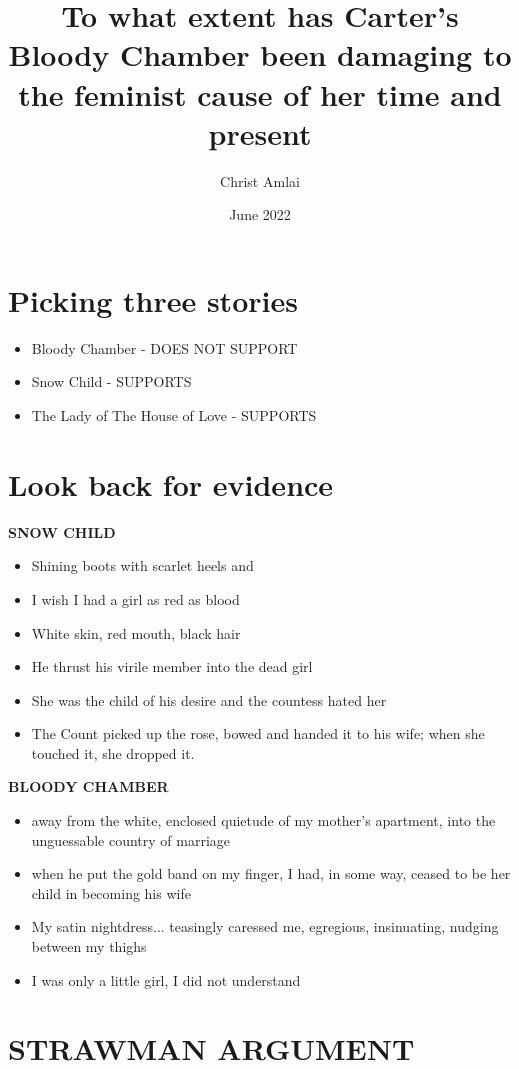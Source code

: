 \documentclass{article}
\title{To what extent has Carter's Bloody Chamber been damaging to the feminist cause of her time and present}
\author{Christ Amlai}
\date{June 2022}
\begin{document}
\maketitle

\section{Picking three stories}
\begin{itemize}
    \item Bloody Chamber - DOES NOT SUPPORT
    \item Snow Child - SUPPORTS
    \item The Lady of The House of Love - SUPPORTS
\end{itemize}

\section{Look back for evidence}
\textbf{SNOW CHILD}
\begin{itemize}
\item{Shining boots with scarlet heels and}
\item{I wish I had a girl as red as blood}
\item{White skin, red mouth, black hair}
\item{He thrust his virile member into the dead girl}
\item{She was the child of his desire and the countess hated her}
\item{The Count picked up the rose, bowed and handed it to his wife; when she touched it, she dropped it.}
\end{itemize}
\textbf{BLOODY CHAMBER}
\begin{itemize}
\item{away from the white, enclosed quietude of my mother's apartment, into the unguessable country of marriage}
\item{when he put the gold band on my finger, I had, in some way, ceased to be her child in becoming his wife}
\item{My satin nightdress... teasingly caressed me, egregious, insinuating, nudging between my thighs}
\item{I was only a little girl, I did not understand}
\end{itemize}

\section{STRAWMAN ARGUMENT}
\end{document}
